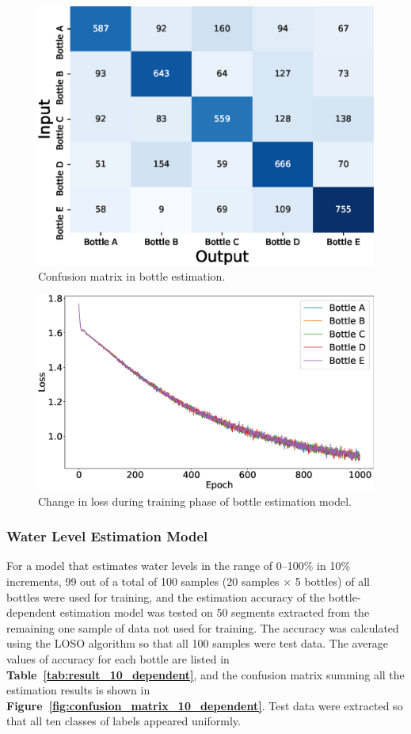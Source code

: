 \documentclass[manuscript,screen,review]{acmart}
\newcommand\figref[1]{\textbf{Figure~\ref{fig:#1}}}
\newcommand\tabref[1]{\textbf{Table~\ref{tab:#1}}}
\begin{document}
\begin{figure}[!t]
  \centering
  \includegraphics[width=0.4\linewidth]{figures/confusion_matrix_5.eps}
  \caption{Confusion matrix in bottle estimation.}
  \label{fig:confusion_matrix_5}
\end{figure}

\begin{figure}[!t]
  \centering
  \includegraphics[width=0.8\linewidth]{figures/loss_5.eps}
  \caption{Change in loss during training phase of bottle estimation model.}
  \label{fig:loss}
\end{figure}

\subsubsection{Water Level Estimation Model}
For a model that estimates water levels in the range of 0--100\% in 10\% increments, 99 out of a total of 100 samples (20 samples $\times$ 5 bottles) of all bottles were used for training, and the estimation accuracy of the bottle-dependent estimation model was tested on 50 segments extracted from the remaining one sample of data not used for training. The accuracy was calculated using the LOSO algorithm so that all 100 samples were test data. The average values of accuracy for each bottle are listed in \tabref{result_10_dependent}, and the confusion matrix summing all the estimation results is shown in \figref{confusion_matrix_10_dependent}. Test data were extracted so that all ten classes of labels appeared uniformly.\par
\end{document}
